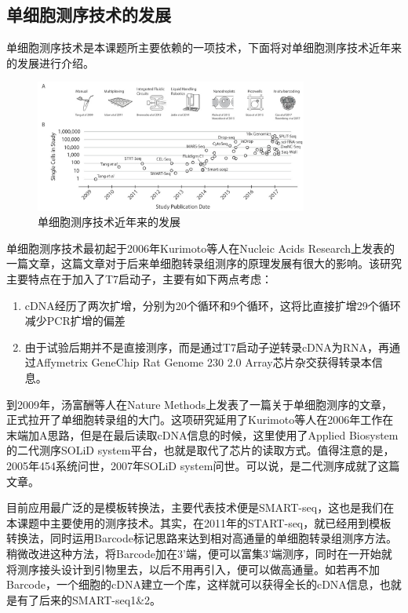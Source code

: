 \documentclass[class = opening]{whuthesis}
\begin{document}
\subsection{单细胞测序技术的发展}
  单细胞测序技术是本课题所主要依赖的一项技术，下面将对单细胞测序技术近年来的发展进行介绍。
\begin{figure}[!htb]
  \centering
  \includegraphics[width=0.8\textwidth]{figs/scseq-development.jpeg}
  \caption{单细胞测序技术近年来的发展}
  \label{fig:scseq-development}
\end{figure}

  单细胞测序技术最初起于2006年Kurimoto等人在Nucleic Acids Research上发表的一篇文章\cite{kurimoto2006improved}，这篇文章对于后来单细胞转录组测序的原理发展有很大的影响。该研究主要特点在于加入了T7启动子，主要有如下两点考虑：
\begin{enumerate}
    \item cDNA经历了两次扩增，分别为20个循环和9个循环，这将比直接扩增29个循环减少PCR扩增的偏差
    \item 由于试验后期并不是直接测序，而是通过T7启动子逆转录cDNA为RNA，再通过Affymetrix GeneChip Rat Genome 230 2.0 Array芯片杂交获得转录本信息。
\end{enumerate}

  到2009年，汤富酬等人在Nature Methods上发表了一篇关于单细胞测序的文章\cite{tang2009mrna}，正式拉开了单细胞转录组的大门。这项研究延用了Kurimoto等人在2006年工作\cite{kurimoto2006improved}在末端加A思路，但是在最后读取cDNA信息的时候，这里使用了Applied Biosystem的二代测序SOLiD system平台，也就是取代了芯片的读取方式。值得注意的是，2005年454系统问世，2007年SOLiD system问世。可以说，是二代测序成就了这篇文章。

  目前应用最广泛的是模板转换法，主要代表技术便是SMART-seq\cite{ramskold2012full,picelli2013smart}，这也是我们在本课题中主要使用的测序技术。其实，在2011年的START-seq\cite{islam2011characterization}，就已经用到模板转换法，同时运用Barcode标记思路来达到相对高通量的单细胞转录组测序方法。稍微改进这种方法，将Barcode加在3'端，便可以富集3'端测序，同时在一开始就将测序接头设计到引物里去，以后不用再引入，便可以做高通量。如若再不加Barcode，一个细胞的cDNA建立一个库，这样就可以获得全长的cDNA信息，也就是有了后来的SMART-seq1\&2。
\end{document}
